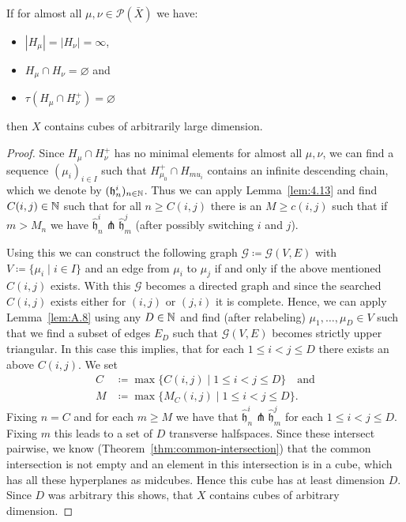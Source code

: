 \begin{prop}[{\cite[Proposition~4.10]{MR3509968}}]
  \label{prop:4.10}
  If for almost all \(\mu, \nu \in \mathcal{P}(\bar X)\) we have:
  \begin{itemize}
  \item \(|H_\mu| = |H_\nu| = \infty\),
  \item \(H_\mu \cap H_\nu = \varnothing\) and
  \item \(\tau(H_\mu \cap H_\nu^+) = \varnothing\)
  \end{itemize}
  then \(X\) contains cubes of arbitrarily large dimension.
\end{prop}

\begin{proof}
  Since \(H_\mu \cap H_\nu^+\) has no minimal elements for almost all \(\mu, \nu\), we can find a sequence \((\mu_i)_{i \in I}\) such that \(H_{\mu_0}^+ \cap H_{mu_i}\) contains an infinite descending chain, which we denote by \((\mathfrak{h}^i_n)_{n \in \mathbb{N}}\). Thus we can apply Lemma~\ref{lem:4.13} and find \(C(i,j) \in \mathbb{N}\) such that for all \(n \geq C(i,j)\) there is an \(M \geq c(i,j)\) such that if \(m > M_n\) we have \(\mathfrak{\hat h}_n^i \pitchfork \mathfrak{\hat h}_m^j\) (after possibly switching \(i\) and \(j\)).

  Using this we can construct the following graph \(\mathcal{G} \coloneqq \mathcal{G}(V,E)\) with \(V \coloneqq \{\mu_i \mid i \in I\}\) and an edge from \(\mu_i\) to \(\mu_j\) if and only if the above mentioned \(C(i,j)\) exists. With this \(\mathcal{G}\) becomes a directed graph and since the searched \(C(i,j)\) exists either for \((i,j)\) or \((j,i)\) it is complete. Hence, we can apply Lemma~\ref{lem:A.8} using any \(D \in \mathbb{N}\) and find (after relabeling) \(\mu_1, \dots, \mu_D \in V\) such that we find a subset of edges \(E_D\) such that \(\mathcal{G}(V,E)\) becomes strictly upper triangular. In this case this implies, that for each \(1\leq i < j \leq D\) there exists an above \(C(i,j)\). We set
  \begin{align*}
    C &\coloneqq \max\{C(i,j) \mid 1 \leq i < j \leq D\} \quad \text{and}\\
    M &\coloneqq \max\{M_C(i,j) \mid 1 \leq i < j \leq D\}.
  \end{align*}
  Fixing \(n = C\) and for each \(m \geq M\) we have that \(\mathfrak{\hat h}_n^i \pitchfork \mathfrak{\hat h}_m^j\) for each \(1 \leq i < j \leq D\). Fixing \(m\) this leads to a set of \(D\) transverse halfspaces. Since these intersect pairwise, we know (Theorem~\ref{thm:common-intersection}) that the common intersection is not empty and an element in this intersection is in a cube, which has all these hyperplanes as midcubes. Hence this cube has at least dimension \(D\). Since \(D\) was arbitrary this shows, that \(X\) contains cubes of arbitrary dimension.
\end{proof}

